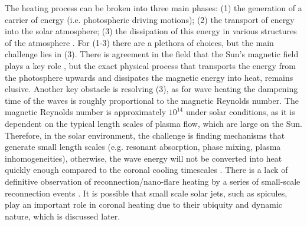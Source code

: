 The heating process can be broken into three main phases: (1) the generation of a carrier of energy (i.e. photospheric driving motions); (2) the transport of energy into the solar atmosphere; (3) the dissipation of this energy in various structures of the atmosphere \citep{Wentzel1974SoPh39129W, Robert2004AG45d34E}. For (1-3) there are a plethora of choices, but the main challenge lies in (3). There is agreement in the field that the Sun's magnetic field plays a key role \citep{Parnell2012RSPTA3703217P, Arregui2015RSPTA37340261A}, but the exact physical process that transports the energy from the photosphere upwards and dissipates the magnetic energy into heat, remains elusive. Another key obstacle is resolving (3), as for wave heating the dampening time of the waves is roughly proportional to the magnetic Reynolds number. The magnetic Reynolds number is approximately  $10^{14}$ under solar conditions, as it is dependent on the typical length scales of plasma flow, which are large on the Sun. Therefore, in the solar environment, the challenge is finding mechanisms that generate small length scales (e.g. resonant absorption, phase mixing, plasma inhomogeneities), otherwise, the wave energy will not be converted into heat quickly enough compared to the coronal cooling timescales \citep{Doorsselaere2020SSRv216140V}. There is a lack of definitive observation of reconnection/nano-flare heating by a series of small-scale reconnection events \citep{Hudson1991SoPh133357H, Parnell2012RSPTA3703217P}. It is possible that small scale solar jets, such as spicules, play an important role in coronal heating due to their ubiquity and dynamic nature, which is discussed later.
